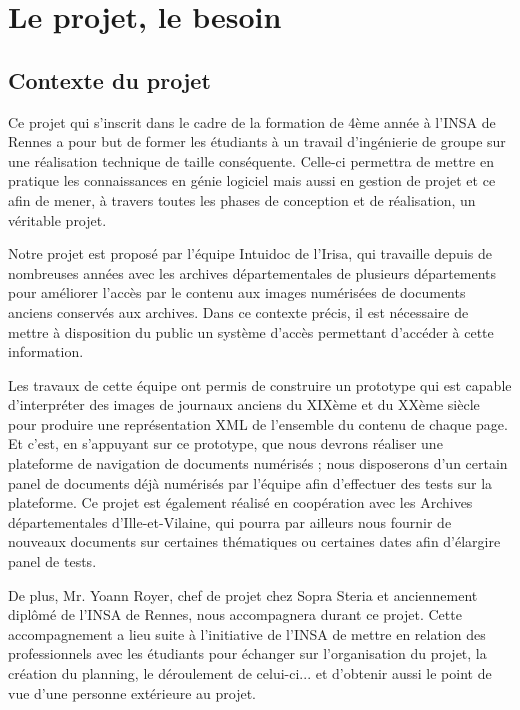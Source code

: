 \section{Le projet, le besoin}
\label{sec:intro}

    \subsection{Contexte du projet}
    \label{subsec:contexte}
    Ce projet qui s’inscrit dans le cadre de la formation de 4ème année à l’INSA de Rennes a pour but
    de former les étudiants à un travail d’ingénierie de groupe sur une réalisation technique de taille conséquente.
    Celle-ci permettra de mettre en pratique les connaissances en génie logiciel mais aussi en gestion
    de projet et ce afin de mener, à travers toutes les phases de conception et de réalisation, un véritable projet.

    Notre projet est proposé par l’équipe Intuidoc de l’Irisa, qui travaille depuis de nombreuses années
    avec les archives départementales de plusieurs départements pour améliorer l’accès par le contenu
    aux images numérisées de documents anciens conservés aux archives. Dans ce contexte précis,
    il est nécessaire de mettre à disposition du public un système d’accès permettant d’accéder à cette information.

    Les travaux de cette équipe ont permis de construire un prototype qui est capable d’interpréter des images
    de journaux anciens du XIXème et du XXème siècle pour produire une représentation XML de l’ensemble du contenu
    de chaque page. Et c’est, en s’appuyant sur ce prototype, que nous devrons réaliser une plateforme de navigation
    de documents numérisés ; nous disposerons d’un certain panel de documents déjà numérisés par l’équipe afin
    d’effectuer des tests sur la plateforme. Ce projet est également réalisé en coopération avec les Archives départementales
    d’Ille-et-Vilaine, qui pourra par ailleurs nous fournir de nouveaux documents sur certaines thématiques ou certaines
    dates afin d’élargire panel de tests.

    De plus, Mr. Yoann Royer, chef de projet chez Sopra Steria et anciennement diplômé de l’INSA de Rennes,
    nous accompagnera durant ce projet. Cette accompagnement a lieu suite à l’initiative de l’INSA de mettre
    en relation des professionnels avec les étudiants pour échanger sur l’organisation du projet,
    la création du planning, le déroulement de celui-ci... et d’obtenir aussi le point de vue d’une personne extérieure au projet.


